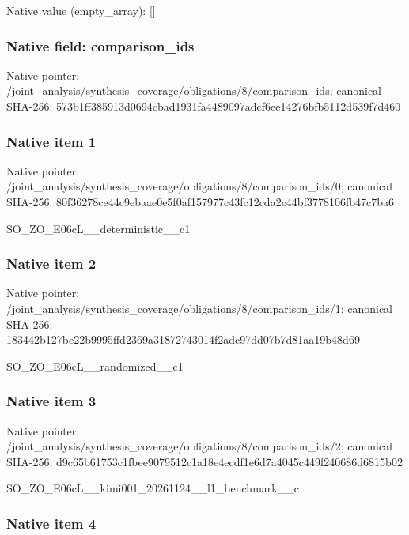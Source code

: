\documentclass[10pt,a4paper]{article}
\begin{document}
Native value (empty\_array): []



\subsubsection{Native field: comparison\_ids}


Native pointer: /joint\_analysis/synthesi\allowbreak{}s\_coverage/obligations/8\allowbreak{}/comparison\_ids; canonical SHA-256: 573b1ff385913d0694cbad19\allowbreak{}31fa4489097adcf6ee14276b\allowbreak{}fb5112d539f7d460



\subsubsection{Native item 1}


Native pointer: /joint\_analysis/synthesi\allowbreak{}s\_coverage/obligations/8\allowbreak{}/comparison\_ids/0; canonical SHA-256: 80f36278ce44c9ebaae0e5f0\allowbreak{}af157977c43fc12cda2c44bf\allowbreak{}3778106fb47c7ba6


SO\_ZO\_E06cL\_\_deterministic\_\_c1


\subsubsection{Native item 2}


Native pointer: /joint\_analysis/synthesi\allowbreak{}s\_coverage/obligations/8\allowbreak{}/comparison\_ids/1; canonical SHA-256: 183442b127be22b9995ffd23\allowbreak{}69a31872743014f2adc97dd0\allowbreak{}7b7d81aa19b48d69


SO\_ZO\_E06cL\_\_randomized\_\_c1


\subsubsection{Native item 3}


Native pointer: /joint\_analysis/synthesi\allowbreak{}s\_coverage/obligations/8\allowbreak{}/comparison\_ids/2; canonical SHA-256: d9c65b61753c1fbee9079512\allowbreak{}c1a18e4ecdf1e6d7a4045c44\allowbreak{}9f240686d6815b02


SO\_ZO\_E06cL\_\_kimi001\_202\allowbreak{}61124\_\_l1\_benchmark\_\_c


\subsubsection{Native item 4}
\end{document}
